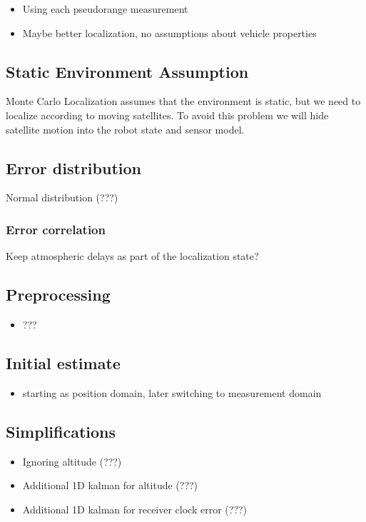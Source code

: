 \begin{itemize}
\item Using each pseudorange measurement
\item Maybe better localization, no assumptions about vehicle properties
\end{itemize}

\subsection{Static Environment Assumption}
\label{sec:gps-mcl-static-env}
Monte Carlo Localization assumes that the environment is static, but we need to
localize according to moving satellites.
To avoid this problem we will hide satellite motion into the robot state and sensor model.

\subsection{Error distribution}
Normal distribution (???)

\subsubsection{Error correlation}
\label{sec:measurement_domain_correlation}
Keep atmospheric delays as part of the localization state?

\subsection{Preprocessing}
\begin{itemize}
\item ???
\end{itemize}

\subsection{Initial estimate}
\begin{itemize}
\item starting as position domain, later switching to measurement domain
\end{itemize}

\subsection{Simplifications}
\begin{itemize}
\item Ignoring altitude (???)
\item Additional 1D kalman for altitude (???)
\item Additional 1D kalman for receiver clock error (???)
\end{itemize}
